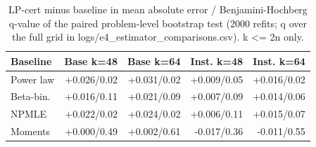 \begin{table}[t]
\centering
\small
\begin{tabular}{lrrrr}
\toprule
Baseline & Base k=48 & Base k=64 & Inst. k=48 & Inst. k=64 \\
\midrule
Power law & +0.026/0.02 & +0.031/0.02 & +0.009/0.05 & +0.016/0.02 \\
Beta-bin. & +0.016/0.11 & +0.021/0.09 & +0.007/0.09 & +0.014/0.06 \\
NPMLE & +0.022/0.02 & +0.024/0.02 & +0.006/0.11 & +0.015/0.07 \\
Moments & +0.000/0.49 & +0.002/0.61 & -0.017/0.36 & -0.011/0.55 \\
\bottomrule
\end{tabular}
\caption{LP-cert minus baseline in mean absolute error / Benjamini-Hochberg q-value of the paired problem-level bootstrap test (2000 refits; q over the full grid in logs/e4\_estimator\_comparisons.csv). k <= 2n only.}
\label{tab:T3b_estimator_tests}
\end{table}
